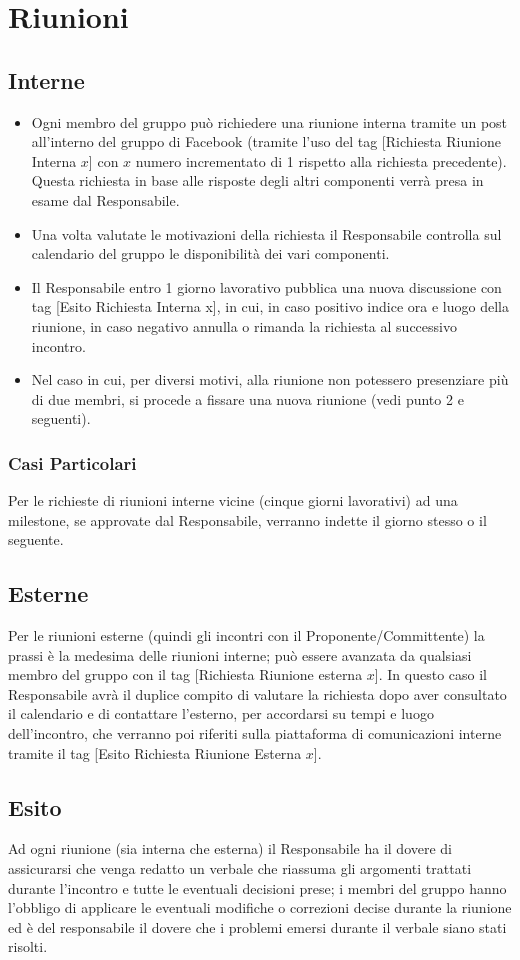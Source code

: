 ﻿\section{Riunioni}{
	\subsection{Interne}{
		\begin{itemize}
			\item Ogni membro del gruppo pu\`{o} richiedere una riunione interna tramite un post all’interno del gruppo di Facebook (tramite l’uso del tag [Richiesta Riunione Interna $x$] con $x$ numero incrementato di 1 rispetto alla richiesta precedente). Questa richiesta  in base alle risposte degli altri componenti verr\`{a} presa in esame dal Responsabile.
			\item Una volta valutate le motivazioni della richiesta il Responsabile controlla sul calendario del gruppo le disponibilit\`{a} dei vari componenti.
			\item Il Responsabile entro 1 giorno lavorativo pubblica una nuova discussione con tag [Esito Richiesta Interna x], in cui, in caso positivo indice ora e luogo della riunione, in caso negativo annulla o rimanda la richiesta al successivo incontro.
			\item Nel caso in cui, per diversi motivi, alla riunione non potessero presenziare pi\`{u} di due membri, si procede a fissare una nuova riunione (vedi punto 2 e seguenti).
		\end{itemize}
		\subsubsection{Casi Particolari}{
			Per le richieste di riunioni interne vicine (cinque giorni lavorativi) ad una milestone, se approvate dal Responsabile, verranno indette il giorno stesso o il seguente.
		}
	}
	\subsection{Esterne}{
		Per le riunioni esterne (quindi gli incontri con il Proponente/Committente) la prassi \`{e} la medesima delle riunioni interne; pu\`{o} essere avanzata da qualsiasi membro del gruppo con il tag [Richiesta Riunione esterna $x$].
		In questo caso il Responsabile avr\`{a} il duplice compito di valutare la richiesta dopo aver consultato il calendario e di contattare  l’esterno, per accordarsi su tempi e luogo dell’incontro, che verranno poi riferiti sulla piattaforma di comunicazioni interne tramite il tag [Esito Richiesta Riunione Esterna $x$].
		}
	\subsection{Esito}{
		Ad ogni riunione (sia interna che esterna) il Responsabile ha il dovere di assicurarsi che venga redatto un verbale che riassuma gli argomenti trattati durante l’incontro e tutte le eventuali decisioni prese; i membri del gruppo hanno l’obbligo di applicare le eventuali modifiche o correzioni decise durante la riunione ed \`{e} del responsabile il dovere che i problemi emersi durante il verbale siano stati risolti.
		}
}